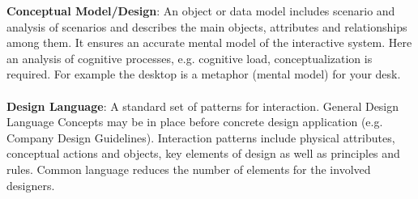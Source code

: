 \textbf{Conceptual Model/Design}: An object or data model includes scenario and analysis of scenarios and describes the main objects, attributes and relationships among them. It ensures an accurate mental model of the interactive system. Here an analysis of cognitive processes, e.g. cognitive load, conceptualization is required. For example the desktop is a metaphor (mental model) for your desk.\\\\
\textbf{Design Language}: A standard set of patterns for interaction. General Design Language Concepts may be in place before concrete design application (e.g. Company Design Guidelines). Interaction patterns include physical attributes, conceptual actions and objects, key elements of design as well as principles and rules. Common language reduces the number of elements for the involved designers.


